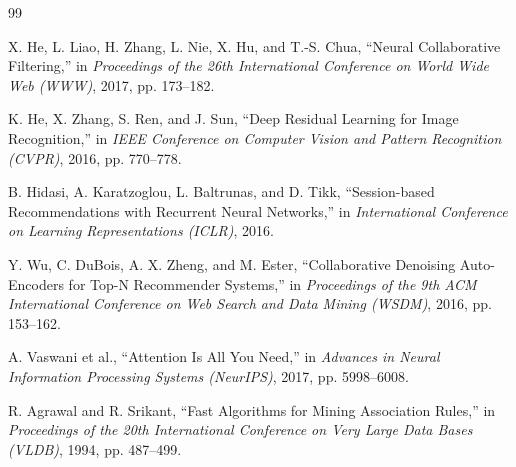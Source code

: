 \documentclass[12pt,a4paper,oneside]{report}
\begin{document}
\begin{thebibliography}{99}

X. He, L. Liao, H. Zhang, L. Nie, X. Hu, and T.-S. Chua, ``Neural Collaborative Filtering,'' in \emph{Proceedings of the 26th International Conference on World Wide Web (WWW)}, 2017, pp. 173--182.

K. He, X. Zhang, S. Ren, and J. Sun, ``Deep Residual Learning for Image Recognition,'' in \emph{IEEE Conference on Computer Vision and Pattern Recognition (CVPR)}, 2016, pp. 770--778.

B. Hidasi, A. Karatzoglou, L. Baltrunas, and D. Tikk, ``Session-based Recommendations with Recurrent Neural Networks,'' in \emph{International Conference on Learning Representations (ICLR)}, 2016.

Y. Wu, C. DuBois, A. X. Zheng, and M. Ester, ``Collaborative Denoising Auto-Encoders for Top-N Recommender Systems,'' in \emph{Proceedings of the 9th ACM International Conference on Web Search and Data Mining (WSDM)}, 2016, pp. 153--162.

A. Vaswani et al., ``Attention Is All You Need,'' in \emph{Advances in Neural Information Processing Systems (NeurIPS)}, 2017, pp. 5998--6008.

R. Agrawal and R. Srikant, ``Fast Algorithms for Mining Association Rules,'' in \emph{Proceedings of the 20th International Conference on Very Large Data Bases (VLDB)}, 1994, pp. 487--499.

\end{thebibliography}
\end{document}
